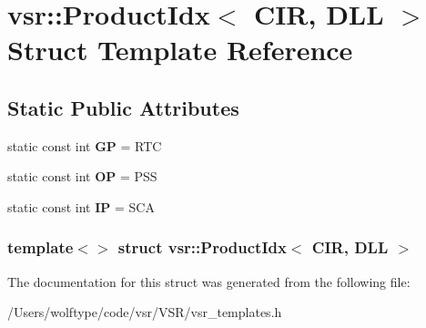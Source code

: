 \hypertarget{structvsr_1_1_product_idx_3_01_c_i_r_00_01_d_l_l_01_4}{\section{vsr\-:\-:Product\-Idx$<$ C\-I\-R, D\-L\-L $>$ Struct Template Reference}
\label{structvsr_1_1_product_idx_3_01_c_i_r_00_01_d_l_l_01_4}
}
\subsection*{Static Public Attributes}
\begin{DoxyCompactItemize}
\item 
\hypertarget{structvsr_1_1_product_idx_3_01_c_i_r_00_01_d_l_l_01_4_a054d09ee5cff9a5770ae764fa228f97a}{static const int {\bfseries G\-P} = R\-T\-C}\label{structvsr_1_1_product_idx_3_01_c_i_r_00_01_d_l_l_01_4_a054d09ee5cff9a5770ae764fa228f97a}

\item 
\hypertarget{structvsr_1_1_product_idx_3_01_c_i_r_00_01_d_l_l_01_4_a0b94ad1b77ae62934265f8c64d5fa925}{static const int {\bfseries O\-P} = P\-S\-S}\label{structvsr_1_1_product_idx_3_01_c_i_r_00_01_d_l_l_01_4_a0b94ad1b77ae62934265f8c64d5fa925}

\item 
\hypertarget{structvsr_1_1_product_idx_3_01_c_i_r_00_01_d_l_l_01_4_a3ca928fd5775d010a78b0a2a290f4d1a}{static const int {\bfseries I\-P} = S\-C\-A}\label{structvsr_1_1_product_idx_3_01_c_i_r_00_01_d_l_l_01_4_a3ca928fd5775d010a78b0a2a290f4d1a}

\end{DoxyCompactItemize}
\subsubsection*{template$<$$>$ struct vsr\-::\-Product\-Idx$<$ C\-I\-R, D\-L\-L $>$}



The documentation for this struct was generated from the following file\-:\begin{DoxyCompactItemize}
\item 
/\-Users/wolftype/code/vsr/\-V\-S\-R/vsr\-\_\-templates.\-h\end{DoxyCompactItemize}
